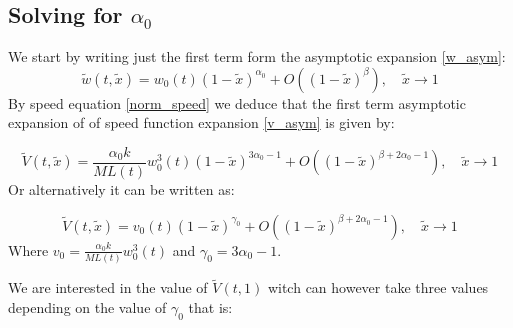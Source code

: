 \subsection{Solving for $\alpha_0$}

We start by writing just the first term form the asymptotic expansion \eqref{w_asym}:
\begin{equation}
\tilde{w}(t,\tilde{x})=w_0(t)(1-\tilde x)^{\alpha_0}+O\left((1-\tilde{x})^{\beta}\right),\quad\tilde{x}\to1\label{w_norm_a1-1}
\end{equation}
By speed equation \eqref{norm_speed} we deduce that the first term asymptotic expansion  of of speed function expansion \eqref{v_asym} is given by:

\begin{equation}
\tilde{V}(t,\tilde{x})=\frac{\alpha_0k}{ML(t)}w_0^3(t)(1-\tilde x)^{3\alpha_{0}-1}+O\left((1-\tilde{x})^{\beta+2\alpha_{0}-1}\right),\quad\tilde{x}\to1\label{eq:-20}
\end{equation}
Or alternatively it can be written as:

\begin{equation}
\tilde{V}(t,\tilde{x})=v_{0}(t)(1-\tilde{x})^{\gamma_{0}}+O\left((1-\tilde x)^{\beta+2\alpha_{0}-1}\right) ,\quad\tilde{x}\to1\label{v_one_term}
\end{equation}
Where $v_{0}=\frac{\alpha_0k}{ML(t)}w_0^3(t)$ and $\gamma_{0}=3\alpha_{0}-1$.

We are interested in the value of $\tilde{V}(t,1)$ witch can however take three values depending on the value of $\gamma_{0}$ that is:

